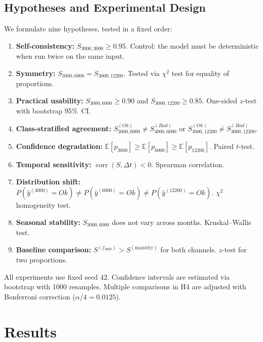 \documentclass{article}
\theoremstyle{plain}
\theoremstyle{definition}
\begin{document}
\subsection{Hypotheses and Experimental Design}
\label{sec:hypotheses}

We formulate nine hypotheses, tested in a fixed order:

\begin{enumerate}
  \item[H1] \textbf{Self-consistency:} $S_{3000,3000} \geq 0.95$.
    Control: the model must be deterministic when run twice on the same input.
  \item[H2] \textbf{Symmetry:}
    $S_{3000,6000} = S_{3000,12200}$.  Tested via $\chi^2$ test for
    equality of proportions.
  \item[H3] \textbf{Practical usability:}
    $S_{3000,6000} \geq 0.90$ and $S_{3000,12200} \geq 0.85$.
    One-sided $z$-test with bootstrap 95\%~CI.
  \item[H4] \textbf{Class-stratified agreement:}
    $S^{(Ok)}_{3000,6000} \neq S^{(Bad)}_{3000,6000}$ or
    $S^{(Ok)}_{3000,12200} \neq S^{(Bad)}_{3000,12200}$.
  \item[H5] \textbf{Confidence degradation:}
    $\mathbb{E}[p_{3000}] \geq \mathbb{E}[p_{6000}] \geq \mathbb{E}[p_{12200}]$.
    Paired $t$-test.
  \item[H6] \textbf{Temporal sensitivity:}
    $\operatorname{corr}(S, \Delta t) < 0$.  Spearman correlation.
  \item[H7] \textbf{Distribution shift:}
    $P(\hat{y}^{(3000)}=\textit{Ok}) \neq P(\hat{y}^{(6000)}=\textit{Ok}) \neq
    P(\hat{y}^{(12200)}=\textit{Ok})$.
    $\chi^2$ homogeneity test.
  \item[H8] \textbf{Seasonal stability:}
    $S_{3000,6000}$ does not vary across months.
    Kruskal--Wallis test.
  \item[H9] \textbf{Baseline comparison:}
    $S^{(f_{3000})} > S^{(\text{majority})}$ for both channels.
    $z$-test for two proportions.
\end{enumerate}

All experiments use fixed seed 42.  Confidence intervals are estimated
via bootstrap with 1000 resamples.  Multiple comparisons in H4 are
adjusted with Bonferroni correction ($\alpha/4 = 0.0125$).

\section{Results}
\label{sec:results}
\end{document}
